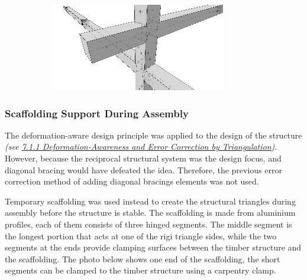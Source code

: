 \documentclass[11pt]{book}
\begin{document}
\begin{figure}[H]
\begin{subfigure}[b]{0.23\textwidth}
\end{subfigure}
\hfill
\begin{subfigure}[b]{0.23\textwidth}
\centering
\includegraphics[width=\textwidth]{./images/image9.jpeg}
\end{subfigure}
\end{figure}


\subsubsection{Scaffolding Support During Assembly}

The deformation-aware design principle was applied to the design of the structure \textit{(see \uline{7.1.1 Deformation-Awareness and Error Correction by Triangulation})}. However, because the reciprocal structural system was the design focus, and diagonal bracing would have defeated the idea. Therefore, the previous error correction method of adding diagonal bracings elements was not used.

Temporary scaffolding was used instead to create the structural triangles during assembly before the structure is stable. The scaffolding is made from aluminium profiles, each of them consists of three hinged segments. The middle segment is the longest portion that acts at one of the rigi triangle sides, while the two segments at the ends provide clamping surfaces between the timber structure and the scaffolding. The photo below shows one end of the scaffolding, the short segments can be clamped to the timber structure using a carpentry clamp.
\end{document}
